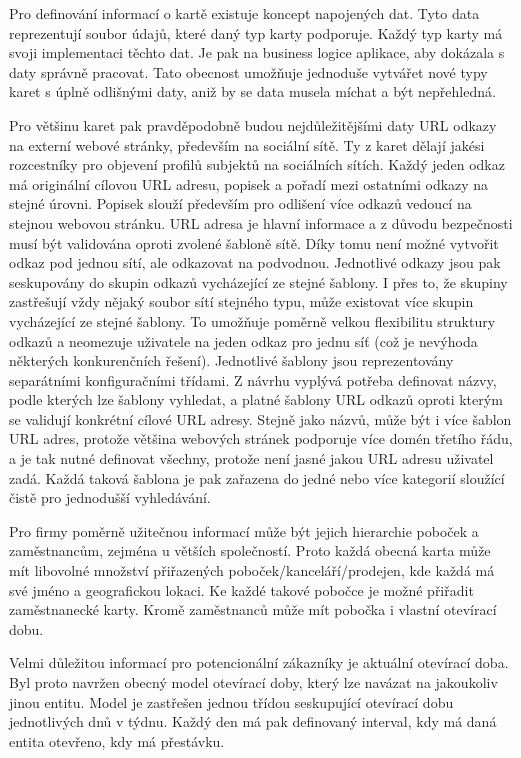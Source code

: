 		Pro definování informací o kartě existuje koncept napojených dat.
		Tyto data reprezentují soubor údajů, které daný typ karty podporuje.
		Každý typ karty má svoji implementaci těchto dat.
		Je pak na business logice aplikace, aby dokázala s daty správně pracovat.
		Tato obecnost umožňuje jednoduše vytvářet nové typy karet s úplně odlišnými daty, aniž by se data musela míchat
		a být nepřehledná.

		Pro většinu karet pak pravděpodobně budou nejdůležitějšími daty \ac{URL} odkazy na externí webové stránky,
		především na sociální sítě.
		Ty z karet dělají jakési rozcestníky pro objevení profilů subjektů na sociálních sítích.
		Každý jeden odkaz má originální cílovou \ac{URL} adresu, popisek a pořadí mezi ostatními odkazy na stejné úrovni.
		Popisek slouží především pro odlišení více odkazů vedoucí na stejnou webovou stránku.
		\ac{URL} adresa je hlavní informace a z důvodu bezpečnosti musí být validována oproti zvolené šabloně sítě.
		Díky tomu není možné vytvořit odkaz pod jednou sítí, ale odkazovat na podvodnou.
		Jednotlivé odkazy jsou pak seskupovány do skupin odkazů vycházející ze stejné šablony.
		I přes to, že skupiny zastřešují vždy nějaký soubor sítí stejného typu, může existovat více skupin vycházející ze
		stejné šablony.
		To umožňuje poměrně velkou flexibilitu struktury odkazů a neomezuje uživatele na jeden odkaz pro jednu síť (což je
		nevýhoda některých konkurenčních řešení).
		Jednotlivé šablony jsou reprezentovány separátními konfiguračními třídami.
		Z návrhu vyplývá potřeba definovat názvy, podle kterých lze šablony vyhledat, a platné šablony \ac{URL} odkazů
		oproti kterým se validují konkrétní cílové \ac{URL} adresy.
		Stejně jako názvů, může být i více šablon \ac{URL} adres, protože většina webových stránek podporuje více domén třetího řádu,
		a je tak nutné definovat všechny, protože není jasné jakou \ac{URL} adresu uživatel zadá.
		Každá taková šablona je pak zařazena do jedné nebo více kategorií sloužící čistě pro jednodušší vyhledávání.

		Pro firmy poměrně užitečnou informací může být jejich hierarchie poboček a zaměstnancům, zejména u větších společností.
		Proto každá obecná karta může mít libovolné množství přiřazených poboček/kanceláří/prodejen, kde každá má své jméno
		a geografickou lokaci.
		Ke každé takové pobočce je možné přiřadit zaměstnanecké karty.
		Kromě zaměstnanců může mít pobočka i vlastní otevírací dobu.

		Velmi důležitou informací pro potencionální zákazníky je aktuální otevírací doba.
		Byl proto navržen obecný model otevírací doby, který lze navázat na jakoukoliv jinou entitu.
		Model je zastřešen jednou třídou seskupující otevírací dobu jednotlivých dnů v týdnu.
		Každý den má pak definovaný interval, kdy má daná entita otevřeno, kdy má přestávku.

